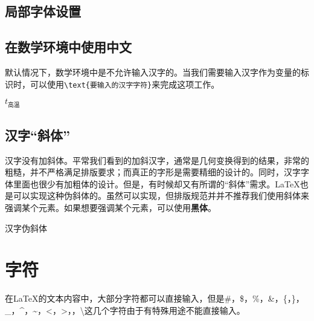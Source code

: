 {\begin{latex}
\setmainfont{TeX Gyre Pagella}%
\setmonofont{DejaVu Sans Mono}%
\setsansfont{微软雅黑}%
\end{latex}

\subsection{局部字体设置}

\begin{latex}
\end{latex}

\subsection{在数学环境中使用中文}
默认情况下，数学环境中是不允许输入汉字的。当我们需要输入汉字作为变量的标识时，可以使用\lstinline|\text{要输入的汉字字符}|来完成这项工作。

\begin{codeshow}
$t_{\text{高温}}$
\end{codeshow}

\subsection{汉字“斜体”}
汉字没有加斜体。平常我们看到的加斜汉字，通常是几何变换得到的结果，非常的粗糙，并不严格满足排版要求；而真正的字形是需要精细的设计的。同时，汉字字体里面也很少有加粗体的设计。但是，有时候却又有所谓的“斜体”需求。\LaTeX 也是可以实现这种伪斜体的。虽然可以实现，但排版规范并并不推荐我们使用斜体来强调某个元素。如果想要强调某个元素，可以使用\textbf{黑体}。

\begin{codeshow}
{汉字伪斜体}
\end{codeshow}

\section{字符}

在\LaTeX 的文本内容中，大部分字符都可以直接输入，但是\#，\$，\%，\&，\{，\}，\_，\^{}，\~{}，\textless，\textgreater，\textbar，\textbackslash 这几个字符由于有特殊用途不能直接输入。

}
